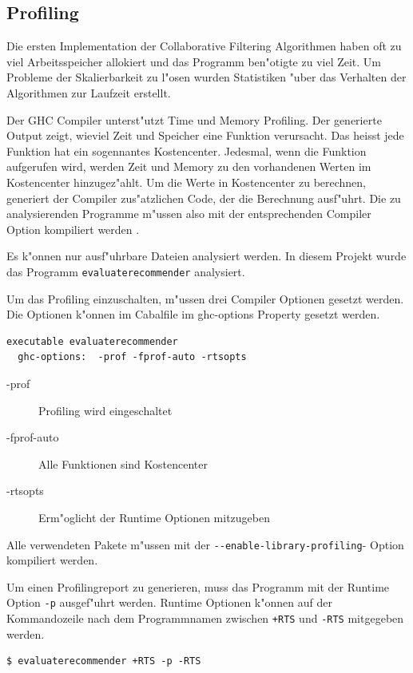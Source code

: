 \documentclass[a4paper, 12pt]{article}
\begin{document}
\subsection{Profiling}
\label{sec:profiling}

Die ersten Implementation der Collaborative Filtering Algorithmen haben oft zu viel Arbeitsspeicher allokiert und das Programm ben"otigte zu viel Zeit. Um Probleme der Skalierbarkeit zu l"osen wurden Statistiken "uber das Verhalten der Algorithmen zur Laufzeit erstellt.

Der GHC Compiler unterst"utzt Time und Memory Profiling. Der generierte Output zeigt, wieviel Zeit und Speicher eine Funktion verursacht. Das heisst jede Funktion hat ein sogennantes Kostencenter. Jedesmal, wenn die Funktion aufgerufen wird, werden Zeit und Memory zu den vorhandenen Werten im Kostencenter hinzugez"ahlt. Um die Werte in Kostencenter zu berechnen, generiert der Compiler zus"atzlichen Code, der die Berechnung ausf"uhrt. Die zu analysierenden Programme m"ussen also mit der entsprechenden Compiler Option kompiliert werden \cite{Mena}.

Es k"onnen nur ausf"uhrbare Dateien analysiert werden. In diesem Projekt wurde das Programm \verb|evaluaterecommender| analysiert.

Um das Profiling einzuschalten, m"ussen drei Compiler Optionen gesetzt werden. Die Optionen k"onnen im Cabalfile im ghc-options Property gesetzt werden.
\begin{verbatim}
executable evaluaterecommender
  ghc-options:	-prof -fprof-auto -rtsopts
\end{verbatim}
\begin{description}
\item[-prof] Profiling wird eingeschaltet
\item[-fprof-auto] Alle Funktionen sind Kostencenter
\item[-rtsopts] Erm"oglicht der Runtime Optionen mitzugeben
\end{description}

Alle verwendeten Pakete m"ussen mit der \verb|--enable-library-profiling|- Option kompiliert werden.

Um einen Profilingreport zu generieren, muss das Programm mit der Runtime Option \verb|-p| ausgef"uhrt werden. Runtime Optionen k"onnen auf der Kommandozeile nach dem Programmnamen zwischen \verb|+RTS| und \verb|-RTS| mitgegeben werden.  

\begin{verbatim}
$ evaluaterecommender +RTS -p -RTS
\end{verbatim}
\end{document}
